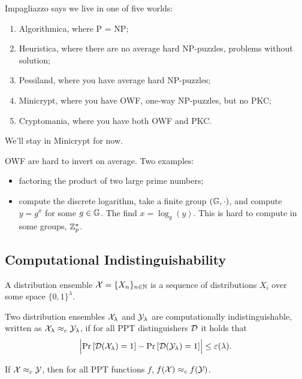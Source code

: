 Impagliazzo says we live in one of five worlds:
\begin{enumerate}
	\item Algorithmica, where P = NP;
	\item Heuristica, where there are no average hard NP-puzzles, \ie problems without solution;
	\item Pessiland, where you have average hard NP-puzzles;
	\item Minicrypt, where you have \ac{OWF}, one-way NP-puzzles, but no \ac{PKC};
	\item Cryptomania, where you have both \ac{OWF} and \ac{PKC}.
\end{enumerate}
We'll stay in Minicrypt for now.

\ac{OWF} are hard to invert on average.
Two examples:
\begin{itemize}
	\item factoring the product of two large prime numbers;
	\item compute the discrete logarithm, \ie take a finite group $(\mathbb{G}, \cdot)$, and compute $y = g^x$ for some $g \in \mathbb{G}$.
	The find $x = \log_{g}(y)$.
	This is hard to compute in some groups, \eg $\mathbb{Z}^{\star}_{p}$.
\end{itemize}

\subsection{Computational Indistinguishability}

\begin{definition}
	A distribution ensemble $\mathcal{X} = \{ X_n \}_{n \in \mathbb{N}}$ is a sequence of distributions $X_i$ over some space $\{0,1\}^{\lambda}$.
\end{definition}

\begin{definition}
	Two distribution ensembles $\mathcal{X}_{\lambda}$ and $\mathcal{Y}_{\lambda}$ are computationally indistinguishable, written as $\mathcal{X}_{\lambda} \approx_c \mathcal{Y}_{\lambda}$, if for all \ac{PPT} distinguishers $\mathcal{D}$ it holds that
	\begin{equation*}
		\left|{\mathop{\mathrm{Pr}}\limits_{} \left[ {\mathcal{D}(\mathcal{X}_{\lambda}) = 1} \right] - \mathop{\mathrm{Pr}}\limits_{} \left[ {\mathcal{D}(\mathcal{Y}_{\lambda}) = 1} \right]}\right| \le \varepsilon(\lambda).
	\end{equation*}
\end{definition}

\begin{lemma}[Reduction] \label{lem:reduction}
	If $\mathcal{X} \approx_c \mathcal{Y}$, then for all \ac{PPT} functions $f$, $f(\mathcal{X}) \approx_c f(\mathcal{Y})$.
\end{lemma}

